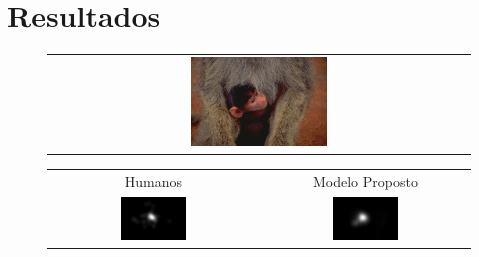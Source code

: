 \documentclass[10pt]{beamer}
\newcommand{\tit}[1]{\textit{#1}}
\begin{document}

\section{Resultados}

\begin{frame}{}
    \begin{figure}[hbt]
    \begin{center}
		\begin{tabular} {c}
		\includegraphics[width=0.33\textwidth]{./img/monkey_s.jpg}
		\end{tabular}
    \end{center}
    \end{figure}
    \begin{figure}[hbt]
    \begin{center}
		\begin{tabular} {cc}
        Humanos & Modelo Proposto\\
        \includegraphics[width=0.33\textwidth]{./img/monkey_gt.jpg} &
		\includegraphics[width=0.33\textwidth]{./img/monkey_m.jpg}
		\end{tabular}
    \end{center}
    \end{figure}
\end{frame}
\end{document}
